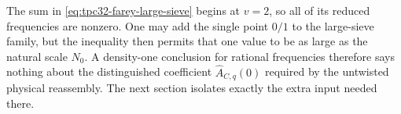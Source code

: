 \begin{remark}
The sum in \eqref{eq:tpc32-farey-large-sieve} begins at $v=2$, so all
of its reduced frequencies are nonzero.  One may add the single point
$0/1$ to the large-sieve family, but the inequality then permits that
one value to be as large as the natural scale $N_0$.  A density-one
conclusion for rational frequencies therefore says nothing about the
distinguished coefficient $\widehat A_{C,q}(0)$ required by the
untwisted physical reassembly.  The next section isolates exactly the
extra input needed there.
\end{remark}
